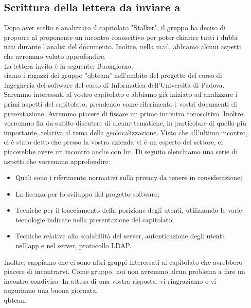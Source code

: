 \subsection{Scrittura della lettera da inviare a \ZD{}}
Dopo aver scelto e analizzato il capitolato "Stalker", il gruppo ha deciso di proporre al proponente \Proponente{} un incontro conoscitivo per poter chiarire tutti i dubbi nati durante l'analisi del documento. Inoltre, nella mail, abbiamo alcuni aspetti che avremmo voluto approfondire.
\\La lettera invita è la seguente:
\bigskip
\newline
Buongiorno,
\\siamo i ragazzi del gruppo "qbteam" nell'ambito del progetto del corso di Ingegneria del software del corso di Informatica dell'Università di Padova. Saremmo interessati al vostro capitolato e abbiamo già iniziato ad analizzare i primi aspetti del capitolato, prendendo come riferimento i vostri documenti di presentazione. Avremmo piacere di fissare un primo incontro conoscitivo. Inoltre vorremmo fin da subito discutere di alcune tematiche, in particolare di quella più importante, relativa al tema della geolocalizzazione. Visto che all'ultimo incontro, ci è stato detto che presso la vostra azienda vi è un esperto del settore, ci piacerebbe avere un incontro anche con lui. Di seguito elenchiamo una serie di aspetti che vorremmo approfondire:
\begin{itemize}
	\item Quali sono i riferimento normativi sulla privacy da tenere in considerazione;
	\item La licenza per lo sviluppo del progetto software;
	\item Tecniche per il tracciamento della posizione degli utenti, utilizzando le varie tecnologie indicate nella presentazione del capitolato;
	\item Tecniche relative alla scalabilità del server, autenticazione degli utenti nell'app e nel server, protocollo LDAP.
\end{itemize}
Inoltre, sappiamo che ci sono altri gruppi interessati al capitolato che avrebbero piacere di incontrarvi. Come gruppo, noi non avremmo alcun problema a fare un incontro condiviso.
In attesa di una vostra risposta, vi ringraziamo e vi auguriamo una buona giornata,
\\qbteam

